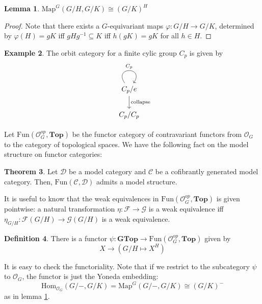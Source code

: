 \documentclass{article}
\theoremstyle{definition}
\newtheorem{theorem}{Theorem}[section] %
\newtheorem{definition}[theorem]{Definition}
\newtheorem{lemma}[theorem]{Lemma}
\newtheorem{example}[theorem]{Example}
\begin{document}
\begin{tcolorbox}
\begin{lemma}
\label{equihom}
$\textrm{Map}^G(G/H,G/K)\cong (G/K)^H$
\end{lemma}
\end{tcolorbox}
\begin{proof}
    Note that there exists a $G$-equivariant maps $\varphi: G/H\to G/K$, determined by $\varphi(H)=gK$ iff $gHg^{-1}\subseteq K$ iff $h(gK)=gK$ for all $h\in H$. 
\end{proof}


\begin{tcolorbox}[colback=yellow!5!white,colframe=yellow!30!white]
\begin{example}
The orbit category for a finite cylic group $C_p$ is given by 
\[\begin{tikzcd}
	{C_p/e} \\
	{C_p/C_p}
	\arrow["{C_p}", from=1-1, to=1-1, loop, in=55, out=125, distance=10mm]
	\arrow["{\textrm{collapse}}", from=1-1, to=2-1]
\end{tikzcd}\]
\end{example}
\end{tcolorbox}

Let $\textrm{Fun}(\mathcal{O}_G^{op},\textbf{Top})$ be the functor category of contravariant functors from $\mathcal{O}_G$ to the category of topological spaces. We have the following fact on the model structure on functor categories:

\begin{tcolorbox}[colback=red!5!white,colframe=red!30!white]
\begin{theorem}
Let $\mathcal{D}$ be a model category and $\mathcal{C}$ be a cofibrantly generated model category. Then, $\textrm{Fun}(\mathcal{C},\mathcal{D})$ admits a model structure. 
\end{theorem}
\end{tcolorbox}

It is useful to know that the weak equivalences in $\textrm{Fun}(\mathcal{O}_G^{op},\textbf{Top})$ is given pointwise: a natural transformation $\eta: \mathcal{F}\to \mathcal{G}$ is a weak equivalence iff $\eta_{G/H}:\mathcal{F}(G/H)\to \mathcal{G}(G/H) $ is a weak equivalence. 



\begin{tcolorbox}[colback=purple!5!white,colframe=purple!75!black]
\begin{definition}
\label{thetafunctor}
There is a functor $\psi: \textbf{GTop}\to \textrm{Fun}(\mathcal{O}_G^{op},\textbf{Top})$ given by 
\[X\to (G/H\mapsto X^H)\]
\end{definition}
\end{tcolorbox}
It is easy to check the functoriality. Note that if we restrict to the subcategory $\psi$ to $\mathcal{O}_G$, the functor is just the Yoneda embedding: 
\[\textrm{Hom}_{\mathcal{O}_G}(G/-,G/K)=\textrm{Map}^G(G/-,G/K)\cong (G/K)^-\] 
as in lemma \ref{equihom}.
\end{document}
